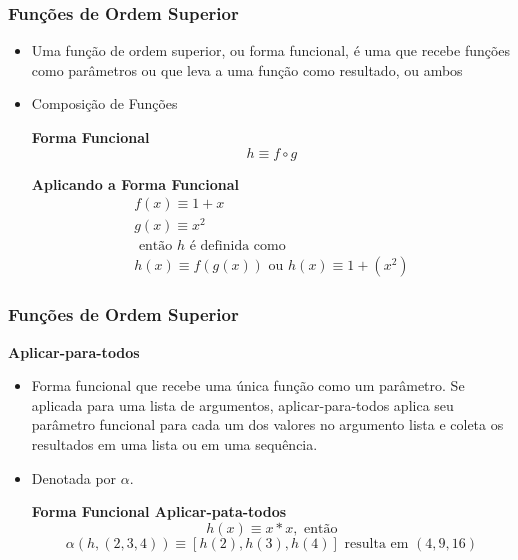 \begin{frame}
	\frametitle{Funções de Ordem Superior}
	\begin{itemize}
		\item Uma função de ordem superior, ou forma funcional, é uma que recebe funções 
		como parâmetros ou que leva a uma função como resultado, ou ambos
		\item Composição de Funções
		\begin{block}{\textbf{Forma Funcional}}
			\[ h \equiv f \circ g \]
		\end{block}

		\begin{block}{\textbf{Aplicando a Forma Funcional}}
			\begin{align*} 
				f(x) \equiv 1 + x \\
				g(x) \equiv x^2 \\
				\mbox{ então } h \mbox{ é definida como} \\
				h(x) \equiv f(g(x)) \mbox{ ou } h(x) \equiv 1 + (x^2)
			\end{align*}
		\end{block}
	\end{itemize}
\end{frame}




\begin{frame}
	\frametitle{Funções de Ordem Superior}
	\textbf{Aplicar-para-todos}
	\begin{itemize}
		\item Forma funcional que recebe uma 
		única função como um parâmetro. Se aplicada para uma lista de argumentos, 
		aplicar-para-todos aplica seu parâmetro funcional para cada um dos valores 
		no argumento lista e coleta os resultados em uma lista ou em uma sequência. 
		
		\item Denotada por $\alpha$.
		\begin{block}{\textbf{Forma Funcional Aplicar-pata-todos}}
			\[ h(x) \equiv x * x, \mbox{ então} \]
			\[ \alpha (h, (2, 3, 4)) \equiv [h(2), h(3), h(4)]
			\mbox{ resulta em } (4, 9, 16) \]
		\end{block}
	\end{itemize}
\end{frame}